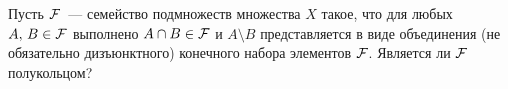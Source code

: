 \begin{task}{4}
    Пусть $\mathcal{F} $~--- семейство подмножеств множества $X$ такое, что для любых
    $A,\, B\in\mathcal{F} $ выполнено $A\cap B\in\mathcal{F} $ и $A\setminus B$ представляется в виде объединения (не обязательно дизъюнктного) конечного набора элементов
    $\mathcal{F} $. Является ли $\mathcal{F} $ полукольцом?
\end{task} 